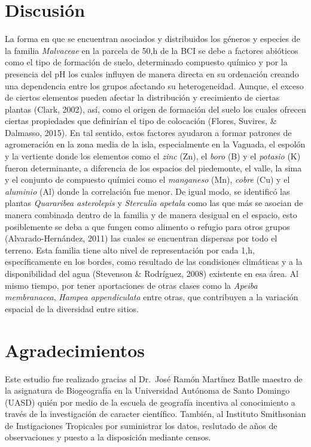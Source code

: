 \documentclass[11pt,]{article}
\begin{document}
\section{Discusión}\label{discusiuxf3n}

La forma en que se encuentran asociados y distribuidos los géneros y
especies de la familia \emph{Malvaceae} en la parcela de 50,h de la BCI
se debe a factores abióticos como el tipo de formación de suelo,
determinado compuesto químico y por la presencia del pH los cuales
influyen de manera directa en su ordenación creando una dependencia
entre los grupos afectando su heterogeneidad. Aunque, el exceso de
ciertos elementos pueden afectar la distribución y crecimiento de
ciertas plantas (Clark, 2002), así, como el origen de formación del
suelo los cuales ofrecen ciertas propiedades que definirían el tipo de
colocación (Flores, Suvires, \& Dalmasso, 2015). En tal sentido, estos
factores ayudaron a formar patrones de agromeración en la zona media de
la isla, especialmente en la Vaguada, el espolón y la vertiente donde
los elementos como el \emph{zinc} (Zn), el \emph{boro} (B) y el
\emph{potasio} (K) fueron determinante, a diferencia de los espacios del
piedemonte, el valle, la sima y el conjunto de compuesto químici como el
\emph{manganeso} (Mn), \emph{cobre} (Cu) y el \emph{aluminio} (Al) donde
la correlación fue menor. De igual modo, se identificó las plantas
\emph{Quararibea asterolepis} y \emph{Sterculia apetala} como las que
más se asocian de manera combinada dentro de la familia y de manera
desigual en el espacio, esto posiblemente se deba a que fungen como
alimento o refugio para otros grupos (Alvarado-Hernández, 2011) las
cuales se encuentran dispersas por todo el terreno. Esta familia tiene
alto nivel de representación por cada 1,h, específicamente en los
bordes, como resultado de las condisiones climáticas y a la
disponibilidad del agua (Stevenson \& Rodríguez, 2008) existente en esa
área. Al mismo tiempo, por tener aportaciones de otras clases como la
\emph{Apeiba membranacea}, \emph{Hampea appendiculata} entre otras, que
contribuyen a la variación espacial de la diversidad entre sitios.

\section{Agradecimientos}\label{agradecimientos}

Este estudio fue realizado gracias al Dr.~José Ramón Martínez Batlle
maestro de la asignatura de Biogeografía en la Universidad Autónoma de
Santo Domingo (UASD) quién por medio de la escuela de geografía
incentiva al conocimiento a través de la investigación de caracter
científico. También, al Instituto Smithsonian de Instigaciones
Tropicales por suministrar los datos, reslutado de años de observaciones
y puesto a la disposición mediante censos.
\end{document}
